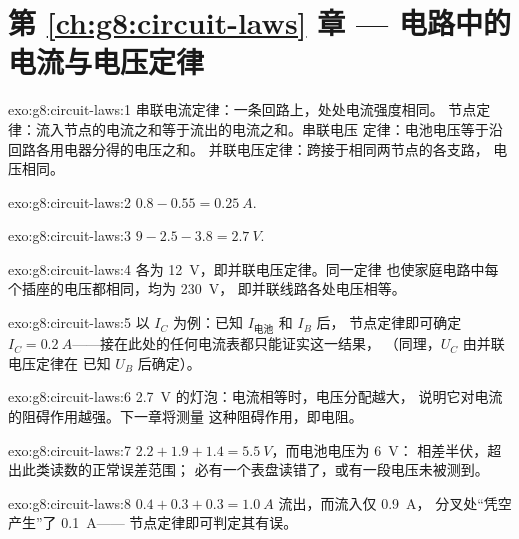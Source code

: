 \section*{第 \ref{ch:g8:circuit-laws} 章 --- 电路中的电流与电压定律}

\begin{solution}{exo:g8:circuit-laws:1}
串联电流定律：一条回路上，处处电流强度相同。
节点定律：流入节点的电流之和等于流出的电流之和。串联电压
定律：电池电压等于沿回路各用电器分得的电压之和。
并联电压定律：跨接于相同两节点的各支路，
电压相同。
\end{solution}

\begin{solution}{exo:g8:circuit-laws:2}
$0.8 - 0.55 = \qty{0.25}{A}$.
\end{solution}

\begin{solution}{exo:g8:circuit-laws:3}
$9 - 2.5 - 3.8 = \qty{2.7}{V}$.
\end{solution}

\begin{solution}{exo:g8:circuit-laws:4}
各为 \qty{12}{V}，即并联电压定律。同一定律
也使家庭电路中每个插座的电压都相同，均为 \qty{230}{V}，
即并联线路各处电压相等。
\end{solution}

\begin{solution}{exo:g8:circuit-laws:5}
以 $I_C$ 为例：已知 $I_{\text{电池}}$ 和 $I_B$ 后，
节点定律即可确定 $I_C = \qty{0.2}{A}$——接在此处的任何电流表都只能证实这一结果，
（同理，$U_C$ 由并联电压定律在
已知 $U_B$ 后确定）。
\end{solution}

\begin{solution}{exo:g8:circuit-laws:6}
\qty{2.7}{V} 的灯泡：电流相等时，电压分配越大，
说明它对电流的阻碍作用越强。下一章将测量
这种阻碍作用，即电阻。
\end{solution}

\begin{solution}{exo:g8:circuit-laws:7}
$2.2 + 1.9 + 1.4 = \qty{5.5}{V}$，而电池电压为 \qty{6}{V}：
相差半伏，超出此类读数的正常误差范围；
必有一个表盘读错了，或有一段电压未被测到。
\end{solution}

\begin{solution}{exo:g8:circuit-laws:8}
$0.4 + 0.3 + 0.3 = \qty{1.0}{A}$ 流出，而流入仅 \qty{0.9}{A}，
分叉处“凭空产生”了 \qty{0.1}{A}——
节点定律即可判定其有误。
\end{solution}

